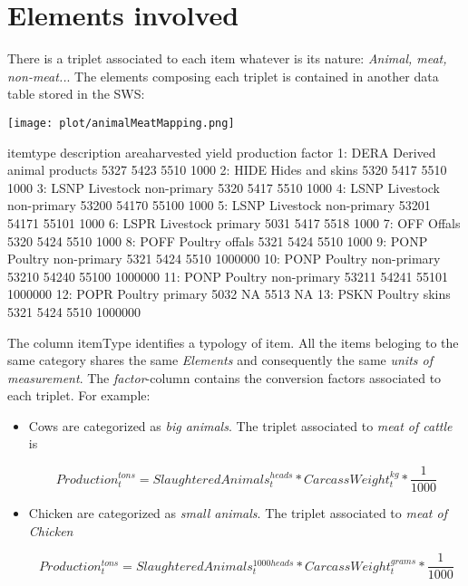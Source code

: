 \documentclass[nojss]{jss}
\begin{document}
\section{Elements involved}

There is a triplet associated to each item whatever is its nature: \textit{Animal, meat, non-meat..}. The elements composing each triplet is contained in another data table stored in the SWS:

\begin{center}
\texttt{[image: plot/animalMeatMapping.png]}
\end{center}


\begin{Schunk}
\begin{Soutput}
    itemtype             description areaharvested yield production  factor
 1:     DERA Derived animal products          5327  5423       5510    1000
 2:     HIDE         Hides and skins          5320  5417       5510    1000
 3:     LSNP   Livestock non-primary          5320  5417       5510    1000
 4:     LSNP   Livestock non-primary         53200 54170      55100    1000
 5:     LSNP   Livestock non-primary         53201 54171      55101    1000
 6:     LSPR       Livestock primary          5031  5417       5518    1000
 7:      OFF                  Offals          5320  5424       5510    1000
 8:     POFF          Poultry offals          5321  5424       5510    1000
 9:     PONP     Poultry non-primary          5321  5424       5510 1000000
10:     PONP     Poultry non-primary         53210 54240      55100 1000000
11:     PONP     Poultry non-primary         53211 54241      55101 1000000
12:     POPR         Poultry primary          5032    NA       5513      NA
13:     PSKN           Poultry skins          5321  5424       5510 1000000
\end{Soutput}
\end{Schunk}

The column itemType identifies a typology of item. All the items beloging to the same category shares the same \textit{Elements} and consequently the same \textit{units of measurement}. The \textit{factor}-column  contains the conversion factors associated to each triplet. For example:

\begin{itemize}
\item{Cows are categorized as \textit{big animals}. The triplet associated to \textit{meat of cattle} is

\begin{dmath*}
Production_{t}^{tons}= SlaughteredAnimals_{t}^{heads} * CarcassWeight_{t}^{kg}*\frac{1}{1000}
\end{dmath*}


}
\item{Chicken are categorized as \textit{small animals}. The triplet associated to \textit{meat of Chicken}

\begin{dmath*}
Production_{t}^{tons}= SlaughteredAnimals_{t}^{1000 heads} * CarcassWeight_{t}^{grams}*\frac{1}{1000}
\end{dmath*}
}
\end{itemize}
\end{document}
